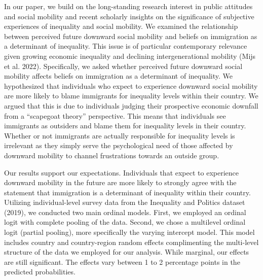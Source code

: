 \documentclass[
  11pt,
]{article}
\begin{document}
In our paper, we build on the long-standing research interest in public
attitudes and social mobility and recent scholarly insights on the
significance of subjective experiences of inequality and social
mobility. We examined the relationship between perceived future downward
social mobility and beliefs on immigration as a determinant of
inequality. This issue is of particular contemporary relevance given
growing economic inequality and declining intergenerational mobility
(Mijs et al. 2022). Specifically, we asked whether perceived future
downward social mobility affects beliefs on immigration as a determinant
of inequality. We hypothesized that individuals who expect to experience
downward social mobility are more likely to blame immigrants for
inequality levels within their country. We argued that this is due to
individuals judging their prospective economic downfall from a
``scapegoat theory'' perspective. This means that individuals see
immigrants as outsiders and blame them for inequality levels in their
country. Whether or not immigrants are actually responsible for
inequality levels is irrelevant as they simply serve the psychological
need of those affected by downward mobility to channel frustrations
towards an outside group.

Our results support our expectations. Individuals that expect to
experience downward mobility in the future are more likely to strongly
agree with the statement that immigration is a determinant of inequality
within their country. Utilizing individual-level survey data from the
Inequality and Politics dataset (2019), we conducted two main ordinal
models. First, we employed an ordinal logit with complete pooling of the
data. Second, we chose a multilevel ordinal logit (partial pooling),
more specifically the varying intercept model. This model includes
country and country-region random effects complimenting the multi-level
structure of the data we employed for our analysis. While marginal, our
effects are still significant. The effects vary between 1 to 2
percentage points in the predicted probabilities.
\end{document}
